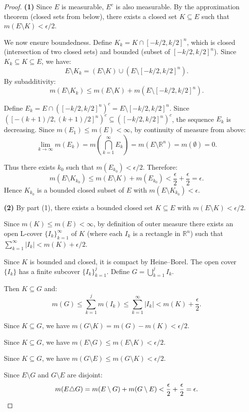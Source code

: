 \documentclass[11pt]{report}
\begin{document}
\begin{proof}
\textbf{(1)} Since $E$ is measurable, $E^c$ is also measurable. By the approximation theorem (closed sets from below), there exists a closed set $K \subseteq E$ such that $m(E \setminus K) < \epsilon/2$.

We now ensure boundedness. Define $K_k = K \cap [-k/2, k/2]^n$, which is closed (intersection of two closed sets) and bounded (subset of $[-k/2, k/2]^n$). Since $K_k \subseteq K \subseteq E$, we have:
\[
E \setminus K_k = (E \setminus K) \cup (E \setminus [-k/2, k/2]^n).
\]
By subadditivity:
\[
m(E \setminus K_k) \leq m(E \setminus K) + m(E \setminus [-k/2, k/2]^n).
\]

Define $E_k = E \cap ([-k/2, k/2]^n)^c = E \setminus [-k/2, k/2]^n$. Since $([-(k+1)/2, (k+1)/2]^n)^c \subseteq ([-k/2, k/2]^n)^c$, the sequence $E_k$ is decreasing. Since $m(E_1) \leq m(E) < \infty$, by continuity of measure from above:
\[
\lim_{k \to \infty} m(E_k) = m\left(\bigcap_{k=1}^{\infty} E_k\right) = m(E \setminus \mathbb{R}^n) = m(\emptyset) = 0.
\]

Thus there exists $k_0$ such that $m(E_{k_0}) < \epsilon/2$. Therefore:
\[
m(E \setminus K_{k_0}) \leq m(E \setminus K) + m(E_{k_0}) < \frac{\epsilon}{2} + \frac{\epsilon}{2} = \epsilon.
\]
Hence $K_{k_0}$ is a bounded closed subset of $E$ with $m(E \setminus K_{k_0}) < \epsilon$.

\textbf{(2)} By part (1), there exists a bounded closed set $K \subseteq E$ with $m(E \setminus K) < \epsilon/2$.

Since $m(K) \leq m(E) < \infty$, by definition of outer measure there exists an open L-cover $\{I_k\}_{k=1}^{\infty}$ of $K$ (where each $I_k$ is a rectangle in $\mathbb{R}^n$) such that $\sum_{k=1}^{\infty} |I_k| < m(K) + \epsilon/2$.

Since $K$ is bounded and closed, it is compact by Heine--Borel. The open cover $\{I_k\}$ has a finite subcover $\{I_k\}_{k=1}^{j}$. Define $G = \bigcup_{k=1}^{j} I_k$.

Then $K \subseteq G$ and:
\[
m(G) \leq \sum_{k=1}^{j} m(I_k) \leq \sum_{k=1}^{\infty} |I_k| < m(K) + \frac{\epsilon}{2}.
\]

Since $K \subseteq G$, we have $m(G \setminus K) = m(G) - m(K) < \epsilon/2$.

Since $K \subseteq G$, we have $m(E \setminus G) \leq m(E \setminus K) < \epsilon/2$.

Since $K \subseteq G$, we have $m(G \setminus E) \leq m(G \setminus K) < \epsilon/2$.

Since $E \setminus G$ and $G \setminus E$ are disjoint:
\[
m(E \triangle G) = m(E \setminus G) + m(G \setminus E) < \frac{\epsilon}{2} + \frac{\epsilon}{2} = \epsilon. \qedhere
\]
\end{proof}
\end{document}

